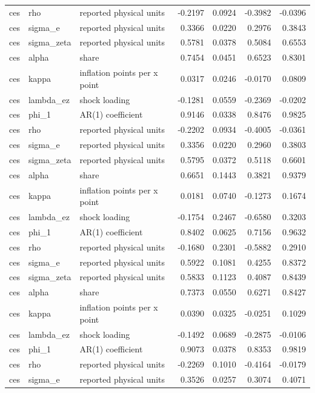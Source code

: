 \begin{tabular}{lllrrrr}
ces & rho & reported physical units & -0.2197 & 0.0924 & -0.3982 & -0.0396 \\
ces & sigma\_e & reported physical units & 0.3366 & 0.0220 & 0.2976 & 0.3843 \\
ces & sigma\_zeta & reported physical units & 0.5781 & 0.0378 & 0.5084 & 0.6553 \\
ces & alpha & share & 0.7454 & 0.0451 & 0.6523 & 0.8301 \\
ces & kappa & inflation points per x point & 0.0317 & 0.0246 & -0.0170 & 0.0809 \\
ces & lambda\_ez & shock loading & -0.1281 & 0.0559 & -0.2369 & -0.0202 \\
ces & phi\_1 & AR(1) coefficient & 0.9146 & 0.0338 & 0.8476 & 0.9825 \\
ces & rho & reported physical units & -0.2202 & 0.0934 & -0.4005 & -0.0361 \\
ces & sigma\_e & reported physical units & 0.3356 & 0.0220 & 0.2960 & 0.3803 \\
ces & sigma\_zeta & reported physical units & 0.5795 & 0.0372 & 0.5118 & 0.6601 \\
ces & alpha & share & 0.6651 & 0.1443 & 0.3821 & 0.9379 \\
ces & kappa & inflation points per x point & 0.0181 & 0.0740 & -0.1273 & 0.1674 \\
ces & lambda\_ez & shock loading & -0.1754 & 0.2467 & -0.6580 & 0.3203 \\
ces & phi\_1 & AR(1) coefficient & 0.8402 & 0.0625 & 0.7156 & 0.9632 \\
ces & rho & reported physical units & -0.1680 & 0.2301 & -0.5882 & 0.2910 \\
ces & sigma\_e & reported physical units & 0.5922 & 0.1081 & 0.4255 & 0.8372 \\
ces & sigma\_zeta & reported physical units & 0.5833 & 0.1123 & 0.4087 & 0.8439 \\
ces & alpha & share & 0.7373 & 0.0550 & 0.6271 & 0.8427 \\
ces & kappa & inflation points per x point & 0.0390 & 0.0325 & -0.0251 & 0.1029 \\
ces & lambda\_ez & shock loading & -0.1492 & 0.0689 & -0.2875 & -0.0106 \\
ces & phi\_1 & AR(1) coefficient & 0.9073 & 0.0378 & 0.8353 & 0.9819 \\
ces & rho & reported physical units & -0.2269 & 0.1010 & -0.4164 & -0.0179 \\
ces & sigma\_e & reported physical units & 0.3526 & 0.0257 & 0.3074 & 0.4071 \\

\end{tabular}

